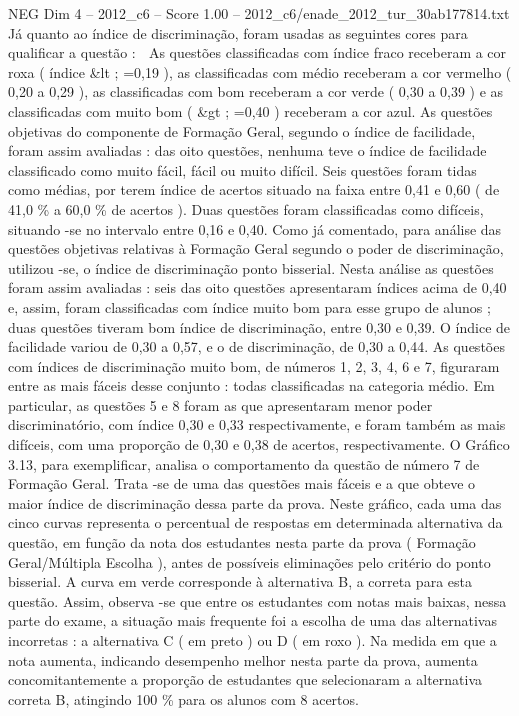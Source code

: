 \begin{textsample}{NEG Dim 4 – 2012\_c6 – Score 1.00 – 2012\_c6/enade\_2012\_tur\_30ab177814.txt}
Já quanto ao índice de discriminação, foram usadas as seguintes cores para qualificar a questão :  As questões classificadas com índice fraco receberam a cor roxa ( índice \&lt ; =0,19 ), as classificadas com médio receberam a cor vermelho ( 0,20 a 0,29 ), as classificadas com bom receberam a cor verde ( 0,30 a 0,39 ) e as classificadas com muito bom ( \&gt ; =0,40 ) receberam a cor azul.
As questões objetivas do componente de Formação Geral, segundo o índice de facilidade, foram assim avaliadas : das oito questões, nenhuma teve o índice de facilidade classificado como muito fácil, fácil ou muito difícil.
Seis questões foram tidas como médias, por terem índice de acertos situado na faixa entre 0,41 e 0,60 ( de 41,0 \% a 60,0 \% de acertos ).
Duas questões foram classificadas como difíceis, situando -se no intervalo entre 0,16 e 0,40.
Como já comentado, para análise das questões objetivas relativas à Formação Geral segundo o poder de discriminação, utilizou -se, o índice de discriminação ponto bisserial.
Nesta análise as questões foram assim avaliadas : seis das oito questões apresentaram índices acima de 0,40 e, assim, foram classificadas com índice muito bom para esse grupo de alunos ; duas questões tiveram bom índice de discriminação, entre 0,30 e 0,39.
O índice de facilidade variou de 0,30 a 0,57, e o de discriminação, de 0,30 a 0,44.
As questões com índices de discriminação muito bom, de números 1, 2, 3, 4, 6 e 7, figuraram entre as mais fáceis desse conjunto : todas classificadas na categoria médio.
Em particular, as questões 5 e 8 foram as que apresentaram menor poder discriminatório, com índice 0,30 e 0,33 respectivamente, e foram também as mais difíceis, com uma proporção de 0,30 e 0,38 de acertos, respectivamente.
O Gráfico 3.13, para exemplificar, analisa o comportamento da questão de número 7 de Formação Geral.
Trata -se de uma das questões mais fáceis e a que obteve o maior índice de discriminação dessa parte da prova.
Neste gráfico, cada uma das cinco curvas representa o percentual de respostas em determinada alternativa da questão, em função da nota dos estudantes nesta parte da prova ( Formação Geral/Múltipla Escolha ), antes de possíveis eliminações pelo critério do ponto bisserial.
A curva em verde corresponde à alternativa B, a correta para esta questão.
Assim, observa -se que entre os estudantes com notas mais baixas, nessa parte do exame, a situação mais frequente foi a escolha de uma das alternativas incorretas : a alternativa C ( em preto ) ou D ( em roxo ).
Na medida em que a nota aumenta, indicando desempenho melhor nesta parte da prova, aumenta concomitantemente a proporção de estudantes que selecionaram a alternativa correta B, atingindo 100 \% para os alunos com 8 acertos.

\end{textsample}
